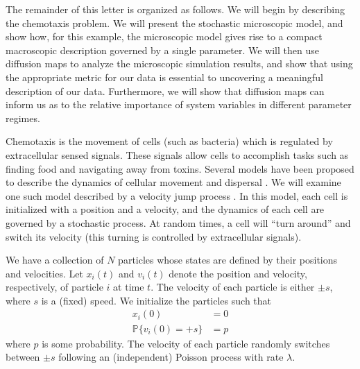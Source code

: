\documentclass[prl, reprint, final, showkeys]{revtex4-1}
\begin{document}
The remainder of this letter is organized as follows. We will begin by describing the chemotaxis problem.
%
We will present the stochastic microscopic model, and show how, for this example, the microscopic model gives rise to a compact macroscopic description governed by a single parameter.
%
We will then use diffusion maps to analyze the microscopic simulation results, and show that using the appropriate metric for our data is essential to uncovering a meaningful description of our data.
%
Furthermore, we will show that diffusion maps can inform us as to the relative importance of system variables in different parameter regimes.



Chemotaxis is the movement of cells (such as bacteria) which is regulated by extracellular sensed signals.
%
These signals allow cells to accomplish tasks such as finding food and navigating away from toxins.
%
Several models have been proposed to describe the dynamics of cellular movement and dispersal \cite{othmer1988models, codling2008random}.
%
We will examine one such model described by a velocity jump process \cite{othmer2000diffusion}.
%
In this model, each cell is initialized with a position and a velocity, and the dynamics of each cell are governed by a stochastic process.
%
At random times, a cell will ``turn around'' and switch its velocity (this turning is controlled by extracellular signals). 
%


We have a collection of $N$ particles whose states are defined by their positions and velocities. 
%
Let $x_i(t)$ and $v_i(t)$ denote the position and velocity, respectively, of particle $i$ at time $t$.
%
The velocity of each particle is either $\pm s$, where $s$ is a (fixed) speed. 
%
We initialize the particles such that
\begin{equation}
\begin{aligned}
x_i(0) & = 0 \\
\mathbb{P} \{ v_i(0) = +s \} & = p
\end{aligned}
\end{equation}
where $p$ is some probability.
%
The velocity of each particle randomly switches between $\pm s$ following an (independent) Poisson process with rate $\lambda$.
%
\end{document}

